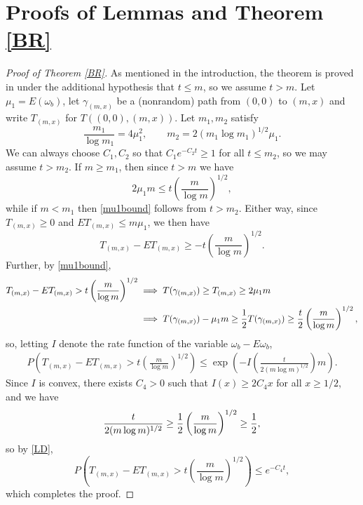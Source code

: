 \documentclass[12pt]{amsart}
\theoremstyle{plain}
\theoremstyle{definition}
\numberwithin{equation}{section}
\begin{document}
\section{Proofs of Lemmas and Theorem \ref{BR}} \label{S:lemmas}
\begin{proof}[Proof of Theorem \ref{BR}]
As mentioned in the introduction, the theorem is proved in \cite{BR08} under the additional hypothesis that $t \leq m$, so we assume $t>m$.  Let $\mu_1=E(\omega_b)$, let $\gamma_{(m,x)}$ be a (nonrandom) path from $(0,0)$ to $(m,x)$ and write $T_{(m,x)}$ for $T((0,0),(m,x))$.  Let $m_1,m_2$ satisfy
\[
  \frac{m_1}{\log m_1} = 4\mu_1^2, \qquad m_2 = 2(m_1 \log m_1)^{1/2} \mu_1.
\]
We can always choose $C_1,C_2$ so that $C_1e^{-C_2t} \geq 1$ for all $t \leq m_2$, so we may assume $t>m_2$.  If $m \geq m_1$, then since $t>m$ we have
\begin{equation} \label{mu1bound}
  2\mu_1m \leq t\left( \frac{m}{\log m} \right)^{1/2},
\end{equation}
while if $m < m_1$ then \eqref{mu1bound} follows from $t>m_2$.  Either way, since $T_{(m,x)}\geq 0$ and $ET_{(m,x)} \leq m\mu_1$, we then have
\[
  T_{(m,x)} - ET_{(m,x)} \geq -t\left( \frac{m}{\log m} \right)^{1/2}.
\]
Further, by \eqref{mu1bound},
\begin{align}
  T_{(m,x)} - ET_{(m,x)} > t\left( \frac{m}{\log m} \right)^{1/2} &\implies T(\gamma_{(m,x)}) \geq T_{(m,x)} \geq 2\mu_1 m \notag \\
  &\implies T(\gamma_{(m,x)}) - \mu_1 m \geq \frac{1}{2} T(\gamma_{(m,x)}) \geq \frac{t}{2} \left( \frac{m}{\log m} \right)^{1/2},
\end{align}
so, letting $I$ denote the rate function of the variable $\omega_b - E\omega_b$,
\begin{align} \label{LD}
  P\left( T_{(m,x)} - ET_{(m,x)} > t\left( \frac{m}{\log m} \right)^{1/2} \right) \leq \exp\left( -I\left( \frac{t}{2(m\log m)^{1/2}} \right) m \right).
\end{align}
Since $I$ is convex, there exists $C_4>0$ such that $I(x) \geq 2C_4x$ for all $x \geq 1/2$, and we have
\[
  \frac{t}{2(m\log m)^{1/2}} \geq \frac{1}{2} \left( \frac{m}{\log m} \right)^{1/2} \geq \frac{1}{2},
\]
so by \eqref{LD},
\[
  P\left( T_{(m,x)} - ET_{(m,x)} > t\left( \frac{m}{\log m} \right)^{1/2} \right) \leq e^{-C_4t},
\]
which completes the proof.
\end{proof}
\end{document}

